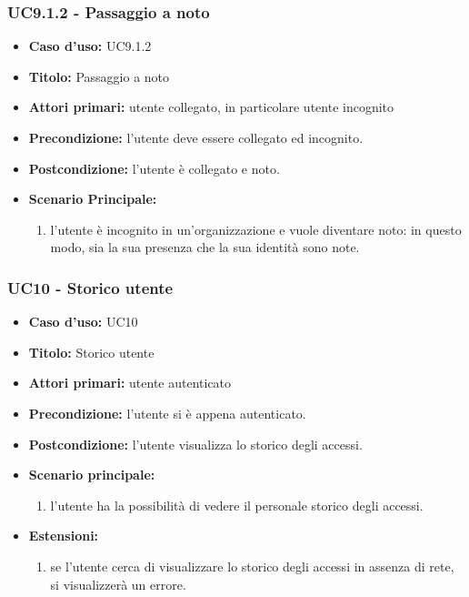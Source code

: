 \documentclass[casi-duso]{subfiles}
\begin{document}
\subsubsection{UC9.1.2 - Passaggio a noto}
\label{subsub:uc9.1.2utente}
\begin{itemize}
  \item \textbf{Caso d’uso:} UC9.1.2
  \item \textbf{Titolo:} Passaggio a noto
  \item \textbf{Attori primari:} utente collegato, in particolare utente incognito
  \item \textbf{Precondizione:} l'utente deve essere collegato ed incognito.
  \item \textbf{Postcondizione:} l'utente è collegato e noto.
  \item \textbf{Scenario Principale:}
  \begin{enumerate}
    \item l'utente è incognito in un'organizzazione e vuole diventare noto: in questo modo, sia la sua presenza che la sua identità sono note.
  \end{enumerate}
\end{itemize}

\subsubsection{UC10 - Storico utente}
\label{subsub:uc10utente}
\begin{itemize}
  \item \textbf{Caso d’uso:} UC10
  \item \textbf{Titolo:} Storico utente
  \item \textbf{Attori primari:} utente autenticato
  \item \textbf{Precondizione:}  l'utente si è appena autenticato.
  \item \textbf{Postcondizione:} l'utente visualizza lo storico degli accessi.
  \item \textbf{Scenario principale:} 
  \begin{enumerate}
    \item l'utente ha la possibilità di vedere il personale storico degli accessi.
  \end{enumerate}  
  \item \textbf{Estensioni:} 
  \begin{enumerate}
    \item se l'utente cerca di visualizzare lo storico degli accessi in assenza di rete, si visualizzerà un errore.
  \end{enumerate}  
\end{itemize}
\end{document}
